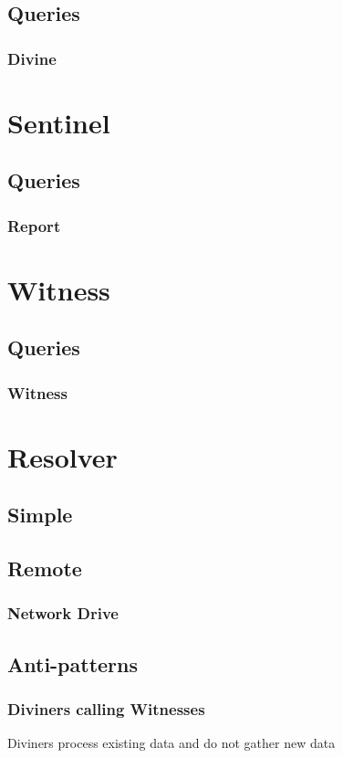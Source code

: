 \documentclass{article}
\begin{document}
\subsection{Queries}
\subsubsection{Divine}

\section{Sentinel}
\subsection{Queries}
\subsubsection{Report}

\section{Witness}
\subsection{Queries}
\subsubsection{Witness}


\section{Resolver}
\subsection{Simple}
\subsection{Remote}
\subsubsection{Network Drive}
\subsection{Anti-patterns}
\subsubsection{Diviners calling Witnesses}
Diviners process existing data and do not gather new data
\end{document}
